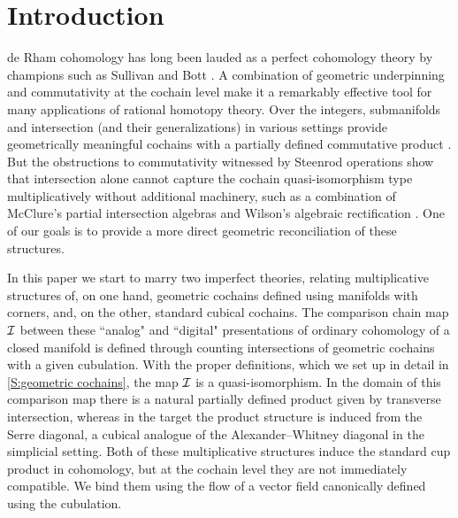 
\section{Introduction}\label{S:intro}

de Rham cohomology has long been lauded as a perfect cohomology theory by champions such as Sullivan \cite{sullivan1977infinitesimal} and Bott \cite{BoTu82}.
A combination of geometric underpinning and commutativity at the cochain level make it a remarkably effective tool for many applications of rational homotopy theory.
Over the integers, submanifolds and intersection (and their generalizations) in various settings provide geometrically meaningful cochains \cite{Lipy14} with a partially defined commutative product \cite{Joyc15, medina2022foundations}.
But the obstructions to commutativity witnessed by Steenrod operations show that intersection alone cannot capture the cochain quasi-isomorphism type multiplicatively without additional machinery, such as a combination of McClure’s partial intersection algebras \cite{McCl06} and Wilson’s algebraic rectification \cite{Wils10}.
One of our goals is to provide a more direct geometric reconciliation of these structures.

In this paper we start to marry two imperfect theories, relating multiplicative structures of, on one hand, geometric cochains defined using manifolds with corners, and, on the other, standard cubical cochains.
The comparison chain map $\mathcal{I}$ between these ``analog" and ``digital" presentations of ordinary cohomology of a closed manifold is defined through counting intersections of geometric cochains with a given cubulation.
With the proper definitions, which we set up in detail in \cref{S:geometric cochains}, the map $\mathcal{I}$ is a quasi-isomorphism.
In the domain of this comparison map there is a natural partially defined product given by transverse intersection, whereas in the target the product structure is induced from the Serre diagonal, a cubical analogue of the Alexander--Whitney diagonal in the simplicial setting.
Both of these multiplicative structures induce the standard cup product in cohomology, but at the cochain level they are not immediately compatible.
We bind them using the flow of a vector field canonically defined using the cubulation.

